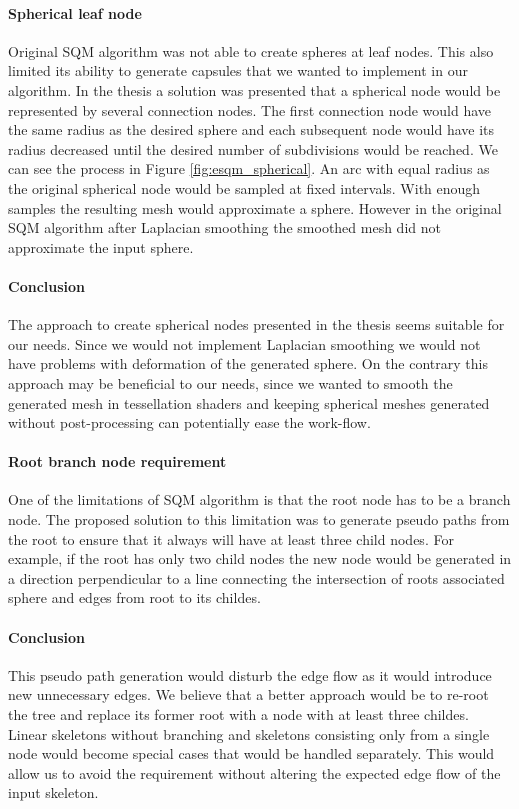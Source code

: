 \paragraph{Spherical leaf node}
Original SQM algorithm was not able to create spheres at leaf nodes. This also limited its ability to generate capsules that we wanted to implement in our algorithm. In the thesis a solution was presented that a spherical node would be represented by several connection nodes. The first connection node would have the same radius as the desired sphere and each subsequent node would have its radius decreased until the desired number of subdivisions would be reached. We can see the process in Figure \ref{fig:esqm_spherical}. An arc with equal radius as the original spherical node would be sampled at fixed intervals. With enough samples the resulting mesh would approximate a sphere. However in the original SQM algorithm after Laplacian smoothing the smoothed mesh did not approximate the input sphere.

\paragraph{Conclusion}
The approach to create spherical nodes presented in the thesis seems suitable for our needs. Since we would not implement Laplacian smoothing we would not have problems with deformation of the generated sphere. On the contrary this approach may be beneficial to our needs, since we wanted to smooth the generated mesh in tessellation shaders and keeping spherical meshes generated without post-processing can potentially ease the work-flow.

\paragraph{Root branch node requirement}
One of the limitations of SQM algorithm is that the root node has to be a branch node. The proposed solution to this limitation was to generate pseudo paths from the root to ensure that it always will have at least three child nodes. For example, if the root has only two child nodes the new node would be generated in a direction perpendicular to a line connecting the intersection of roots associated sphere and edges from root to its childes.

\paragraph{Conclusion}
This pseudo path generation would disturb the edge flow as it would introduce new unnecessary edges. We believe that a better approach would be to re-root the tree and replace its former root with a node with at least three childes. Linear skeletons without branching and skeletons consisting only from a single node would become special cases that would be handled separately. This would allow us to avoid the requirement without altering the expected edge flow of the input skeleton.